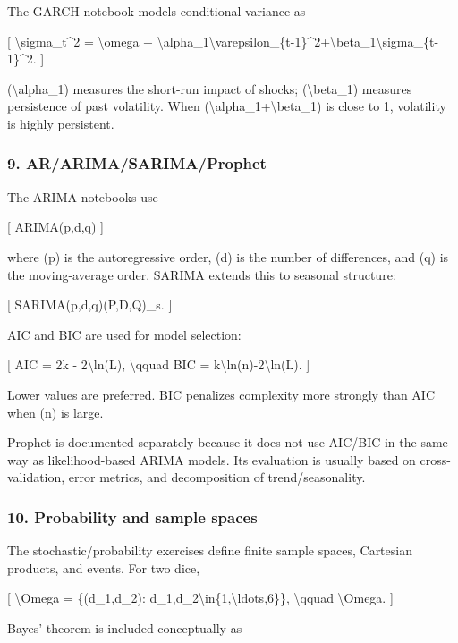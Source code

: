 \documentclass[
  11pt,
]{article}
\begin{document}
The GARCH notebook models conditional variance as

{[} \textbackslash sigma\_t\^{}2 = \textbackslash omega + \textbackslash alpha\_1\textbackslash varepsilon\_\{t-1\}\^{}2+\textbackslash beta\_1\textbackslash sigma\_\{t-1\}\^{}2. {]}

(\textbackslash alpha\_1) measures the short-run impact of shocks; (\textbackslash beta\_1) measures persistence of past volatility. When (\textbackslash alpha\_1+\textbackslash beta\_1) is close to 1, volatility is highly persistent.

\subsubsection{9. AR/ARIMA/SARIMA/Prophet}\label{9-ararimasarimaprophet}

The ARIMA notebooks use

{[} ARIMA(p,d,q) {]}

where (p) is the autoregressive order, (d) is the number of differences, and (q) is the moving-average order. SARIMA extends this to seasonal structure:

{[} SARIMA(p,d,q)(P,D,Q)\_s. {]}

AIC and BIC are used for model selection:

{[} AIC = 2k - 2\textbackslash ln(L), \textbackslash qquad BIC = k\textbackslash ln(n)-2\textbackslash ln(L). {]}

Lower values are preferred. BIC penalizes complexity more strongly than AIC when (n) is large.

Prophet is documented separately because it does not use AIC/BIC in the same way as likelihood-based ARIMA models. Its evaluation is usually based on cross-validation, error metrics, and decomposition of trend/seasonality.

\subsubsection{10. Probability and sample spaces}\label{10-probability-and-sample-spaces}

The stochastic/probability exercises define finite sample spaces, Cartesian products, and events. For two dice,

{[} \textbackslash Omega = \{(d\_1,d\_2): d\_1,d\_2\textbackslash in\{1,\textbackslash ldots,6\}\}, \textbackslash qquad \textbar\textbackslash Omega. {]}

Bayes' theorem is included conceptually as
\end{document}
